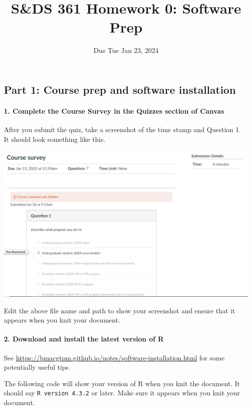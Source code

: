 \documentclass[
]{article}
\title{S\&DS 361 Homework 0: Software Prep}
\author{}
\date{\vspace{-2.5em}Due Tue Jan 23, 2024}
\begin{document}
\maketitle

\subsection{Part 1: Course prep and software
installation}\label{part-1-course-prep-and-software-installation}

\paragraph{1. Complete the Course Survey in the Quizzes section of
Canvas}\label{complete-the-course-survey-in-the-quizzes-section-of-canvas}

After you submit the quiz, take a screenshot of the time stamp and
Question 1. It should look something like this.

\includegraphics{img/361 course survey.png}

Edit the above file name and path to show your screenshot and ensure
that it appears when you knit your document.

\paragraph{2. Download and install the latest version of
R}\label{download-and-install-the-latest-version-of-r}

See \url{https://bmacgtpm.github.io/notes/software-installation.html}
for some potentially useful tips.

The following code will show your version of R when you knit the
document. It should say \texttt{R\ version\ 4.3.2} or later. Make sure
it appears when you knit your document.
\end{document}
